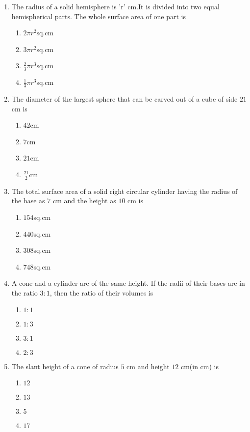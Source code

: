 \documentclass{article}
\begin{document}
\begin{enumerate}
\begin{enumerate}[label=(\roman*)]
    \item The radius of a solid hemisphere is 'r' cm.It is divided into two equal hemispherical parts. The whole surface area of one part is
    \begin{enumerate} [label=(\Alph*)]
        \item $2\pi{r}^2$sq.cm
        \item $3\pi{r}^2$sq.cm
        \item $\frac{2}{3}\pi{r}^3$sq.cm
        \item $\frac{1}{3}\pi{r}^3$sq.cm

\end{enumerate} 

 
\item The diameter of the largest sphere that can be carved out
of a cube of side $21$ cm is
\begin{enumerate} [label=(\Alph*)]
        \item $42$cm
        \item $7$cm
        \item $21$cm
        \item $\frac{21}{2}$cm
\end{enumerate}
\item The total surface area of a solid right circular cylinder
having the radius of the base as $7$ cm and the height as
$10$ cm is
\begin{enumerate} [label=(\Alph*)]
        \item $154$sq.cm
        \item $440$sq.cm
        \item $308$sq.cm
        \item $748$sq.cm
\end{enumerate}
\item A cone and a cylinder are of the same height. If the radii
of their bases are in the ratio $3 : 1$, then the ratio of their
volumes is
\begin{enumerate} [label=(\Alph*)]
        \item $1:1$
        \item $1:3$
        \item $3:1$
        \item $2:3$
\end{enumerate}
\item The slant height of a cone of radius $5$ cm and height $12$ cm(in cm) is
\begin{enumerate} [label=(\Alph*)]
        \item $12$
        \item $13$
        \item $5$
        \item $17$
\end{enumerate}
\end{enumerate}
\end{enumerate}
\end{document}

